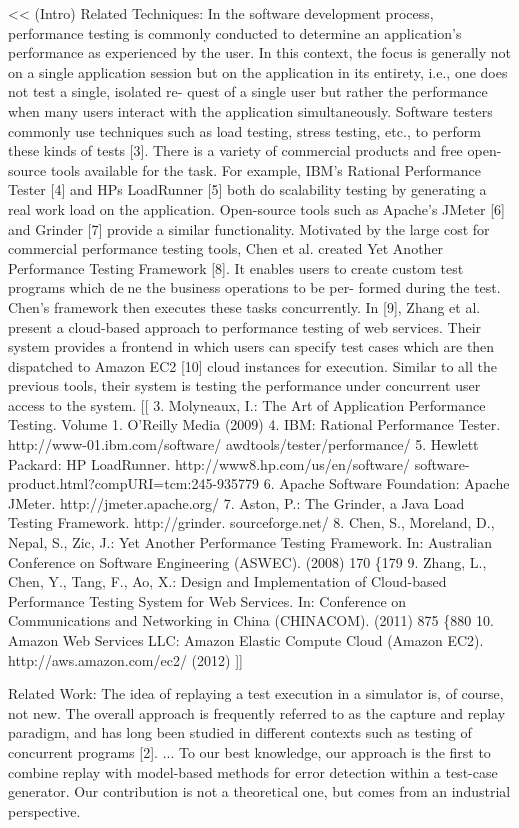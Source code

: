 \documentclass[runningheads,a4paper]{llncs}
\begin{document}
<<
(Intro) Related Techniques: In the software development process, performance testing is 
commonly conducted to determine an application's performance as experienced by the user.
In this context, the focus is generally not on a single application session but
on the application in its entirety, i.e., one does not test a single, isolated re-
quest of a single user but rather the performance when many users interact with
the application simultaneously. Software testers commonly use techniques such
as load testing, stress testing, etc., to perform these kinds of tests [3]. There
is a variety of commercial products and free open-source tools available for the
task. For example, IBM's Rational Performance Tester [4] and HPs LoadRunner
[5] both do scalability testing by generating a real work load on the application.
Open-source tools such as Apache's JMeter [6] and Grinder [7] provide a similar
functionality.
Motivated by the large cost for commercial performance testing tools, Chen
et al. created Yet Another Performance Testing Framework [8]. It enables users
to create custom test programs which dene the business operations to be per-
formed during the test. Chen's framework then executes these tasks concurrently.
In [9], Zhang et al. present a cloud-based approach to performance testing of web
services. Their system provides a frontend in which users can specify test cases
which are then dispatched to Amazon EC2 [10] cloud instances for execution.
Similar to all the previous tools, their system is testing the performance under
concurrent user access to the system.
[[
3. Molyneaux, I.: The Art of Application Performance Testing. Volume 1. O'Reilly
Media (2009)
4. IBM: Rational Performance Tester. http://www-01.ibm.com/software/
awdtools/tester/performance/
5. Hewlett Packard: HP LoadRunner. http://www8.hp.com/us/en/software/
software-product.html?compURI=tcm:245-935779
6. Apache Software Foundation: Apache JMeter. http://jmeter.apache.org/
7. Aston, P.: The Grinder, a Java Load Testing Framework. http://grinder.
sourceforge.net/
8. Chen, S., Moreland, D., Nepal, S., Zic, J.: Yet Another Performance Testing
Framework. In: Australian Conference on Software Engineering (ASWEC). (2008)
170 \{179
9. Zhang, L., Chen, Y., Tang, F., Ao, X.: Design and Implementation of Cloud-based
Performance Testing System for Web Services. In: Conference on Communications
and Networking in China (CHINACOM). (2011) 875 \{880
10. Amazon Web Services LLC: Amazon Elastic Compute Cloud (Amazon EC2).
http://aws.amazon.com/ec2/ (2012)
]]

Related Work: The idea of replaying a test execution in a simulator is, of course, not new. The
overall approach is frequently referred to as the capture and replay paradigm,
and has long been studied in different contexts such as testing of concurrent
programs [2]. ... To our best knowledge, our approach is the first to combine replay with model-based
methods for error detection within a test-case generator. Our contribution is not
a theoretical one, but comes from an industrial perspective.
\end{document}
